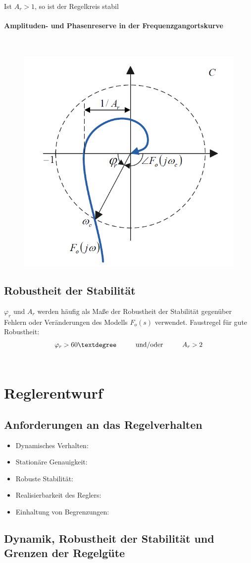 \documentclass[10pt,a4paper]{article}
\renewcommand{\arraystretch}{1.5}
\newcommand{\tab}[1][1]{\hspace*{#1cm}}
\begin{document}
Ist $A_r > 1$, so ist der Regelkreis stabil

\paragraph{Amplituden- und Phasenreserve in der Frequenzgangortskurve} ~\\
\begin{figure}[H]
	\includegraphics[width = 0.4\columnwidth]{imgs/nyquist_ortskurve.png}
\end{figure}

\subsection{Robustheit der Stabilität}
$\varphi_r$ und $A_r$ werden häufig als Maße der Robustheit der Stabilität gegenüber Fehlern oder Veränderungen des Modells $F_o(s)$ verwendet. Faustregel für gute Robustheit:
$$
	\varphi_r > 60° \tab \text{und/oder} \tab A_r > 2
$$ \\

\renewcommand{\arraystretch}{1.5}
\section{Reglerentwurf}
\subsection{Anforderungen an das Regelverhalten}
\begin{itemize}
	\item Dynamisches Verhalten:
	\item Stationäre Genauigkeit:
	\item Robuste Stabilität:
	\item Realisierbarkeit des Reglers:
	\item Einhaltung von Begrenzungen:
\end{itemize}

\subsection{Dynamik, Robustheit der Stabilität und Grenzen der Regelgüte}
\end{document}
